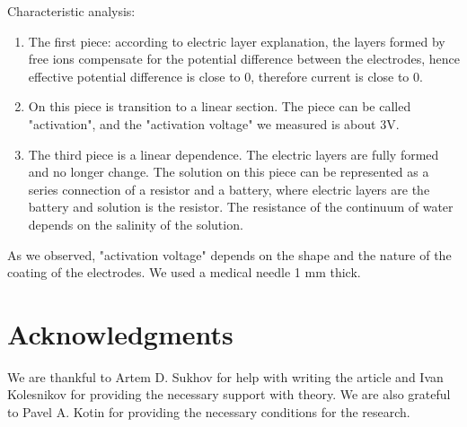 \documentclass{article}
\begin{document}
Characteristic analysis:
\begin{enumerate}   
\item The first piece: according to electric layer explanation, the layers formed by free ions compensate for the potential difference between the electrodes, hence effective potential difference is close to 0, therefore current is close to 0.

\item On this piece is transition to a linear section. The piece can be called "activation", and the "activation voltage" we measured is about 3V.

\item The third piece is a linear dependence. The electric layers are fully formed and no longer change. The solution on this piece can be represented as a series connection of a resistor and a battery, where electric layers are the battery and solution is the resistor. The resistance of the continuum of water depends on the salinity of the solution.
\end{enumerate}

As we observed, "activation voltage" depends on the shape and the nature of the coating of the electrodes. We used a medical needle 1 mm thick.



\section{Acknowledgments}
We are thankful to Artem D. Sukhov for help with writing the article and Ivan Kolesnikov for providing the necessary support with theory. We are also grateful to Pavel A. Kotin for providing the necessary conditions for the research.



\end{document}
